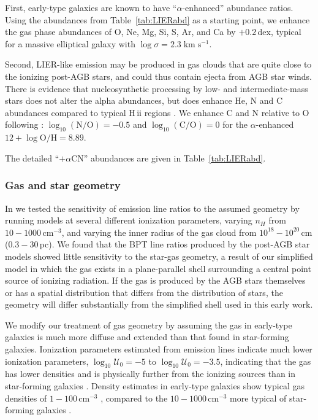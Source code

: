 \documentclass[preprint2]{aastex62}
\newcommand{\hii}{H\,{\sc ii}\xspace}
\newcommand{\logten}{\ensuremath{\log_{10}}}
\newcommand{\logUeq}[1]{\ensuremath{\logten \mathcal{U}_0 = #1}}
\newcommand{\kms}{\ensuremath{\;\mathrm{km}\;\mathrm{s}^{-1}}\xspace}
\newcommand{\alphaCN}{\ensuremath{+\alpha\mathrm{CN}}\xspace}
\begin{document}
First, early-type galaxies are known to have ``$\alpha$-enhanced'' abundance ratios. Using the abundances from Table~\ref{tab:LIERabd} as a starting point, we enhance the gas phase abundances of O, Ne, Mg, Si, S, Ar, and Ca by $+0.2\,$dex, typical for a massive elliptical galaxy with $\log \sigma = 2.3$\kms \citep[e.g.,][]{Zhu+2010, Conroy+2014, Choi+2014}.

Second, LIER-like emission may be produced in gas clouds that are quite close to the ionizing post-AGB stars, and could thus contain ejecta from AGB star winds. There is evidence that nucleosynthetic processing by low- and intermediate-mass stars does not alter the alpha abundances, but does enhance He, N and C abundances compared to typical \hii regions \citep{Karakas+2010, Maciel+2017}. We enhance C and N relative to O following \citet{Henry+2018}: $\logten (\mathrm{N}/\mathrm{O}) = -0.5$ and $\logten (\mathrm{C}/\mathrm{O}) = 0$ for the $\alpha$-enhanced $12 + \log \mathrm{O}/\mathrm{H} = 8.89$.

The detailed ``\alphaCN'' abundances are given in Table~\ref{tab:LIERabd}.

\subsubsection{Gas and star geometry}\label{sec:LIERmod:geometry}

In \citet{Byler+2017} we tested the sensitivity of emission line ratios to the assumed geometry by running models at several different ionization parameters, varying $n_{H}$ from $10-1000\,\mathrm{cm}^{-3}$, and varying the inner radius of the gas cloud from $10^{18}-10^{20}\,$cm ($0.3-30\,$pc). We found that the BPT line ratios produced by the post-AGB star models showed little sensitivity to the star-gas geometry, a result of our simplified model in which the gas exists in a plane-parallel shell surrounding a central point source of ionizing radiation. If the gas is produced by the AGB stars themselves or has a spatial distribution that differs from the distribution of stars, the geometry will differ substantially from the simplified shell used in this early work. 

We modify our treatment of gas geometry by assuming the gas in early-type galaxies is much more diffuse and extended than that found in star-forming galaxies. Ionization parameters estimated from emission lines indicate much lower ionization parameters, \logUeq{-5} to \logUeq{-3.5}, indicating that the gas has lower densities and is physically further from the ionizing sources than in star-forming galaxies \citep{Yan+2012}. Density estimates in early-type galaxies show typical gas densities of $1-100\,\mathrm{cm}^{-3}$ \citep[e.g., ][]{Johansson+2016, Yan+2018}, compared to the $10-1000\,\mathrm{cm}^{-3}$ more typical of star-forming galaxies .
\end{document}
